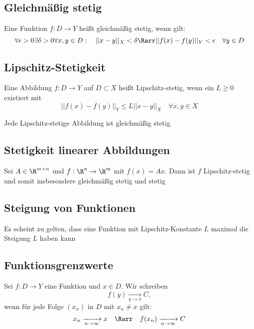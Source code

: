 	\subsection{Gleichmäßig stetig}
		\begin{Definition} [ Gleichmäßigkeit]
			Eine Funktion $f: D\to Y$ heißt gleichmäßig stetig, wenn gilt:
			$$
				\forall \epsilon > 0\exists\delta>0\forall x, y \in D: \quad ||x-y||_X < \delta \Rarr ||f(x)-f(y)||_Y<\epsilon \quad \forall y\in D
			$$
		\end{Definition}
	\subsection{Lipschitz-Stetigkeit}
		\begin{Definition} 
			Eine Abbildung $f: D\to Y$ auf $D\subset X$ heißt Lipschitz-stetig, wenn ein $L\geq 0$ existiert mit 
			$$
				||f(x)-f(y)||_Y\leq L||x-y||_X \quad \forall x, y \in X
			$$
		\end{Definition}
		\begin{Satz}[ ]
			Jede Lipschitz-stetige Abbildung ist gleichmäßig stetig
		\end{Satz}
	\subsection{Stetigkeit linearer Abbildungen}
		\begin{Satz} [ ]
			Sei $A\in \R^{m\times n}$ und $f: \R^n\to \R^m$ mit $f(x)=Ax$. Dann ist $f$ Lipschitz-stetig und somit insbesondere gleichmäßig stetig und stetig
		\end{Satz}
	\subsection{Steigung von Funktionen}
		Es scheint zu gelten, dass eine Funktion mit Lipschitz-Konstante $L$ maximal die Steigung $L$ haben kann
	\subsection{Funktionsgrenzwerte}
		\begin{Definition} [ ]
			Sei $f: D\to Y$ eine Funktion und $x \in D$. Wir schreiben
			$$
				f(y) \xrightarrow[y\to x]{} C,
			$$
			wenn für jede Folge $(x_n)$ in $D$ mit $x_n\not =x$ gilt:
			$$
				x_n\xrightarrow[n\to \infty]{}x \quad \Rarr  \quad f(x_n)\xrightarrow[n \to \infty]{}C
			$$
		\end{Definition}
